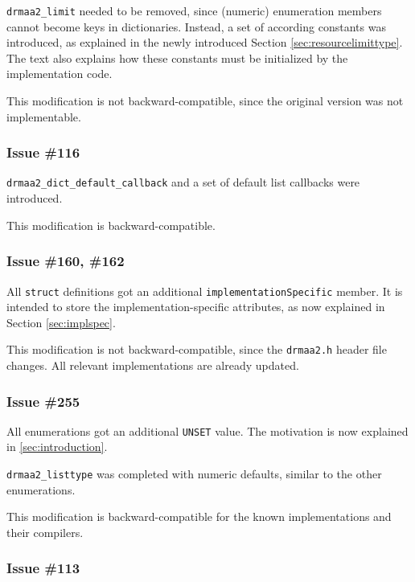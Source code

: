 \documentclass{article}
\newcommand{\h}[1]{\texttt{#1}}
\newcommand{\rat}[1]{}
\begin{document}
\lstinline{drmaa2_limit} needed to be removed, since (numeric) enumeration members cannot become keys in dictionaries. Instead, a set of according constants was introduced, as explained in the newly introduced Section \ref{sec:resourcelimittype}. The text also explains how these constants must be initialized by the implementation code.

\rat{The issue text further discusses why the extern const approach was favoured over a simple macro definition. The main reason is convinience for C++ people.}

This modification is not backward-compatible, since the original version was not implementable.

\subsubsection*{Issue \#116}

\h{drmaa2\_dict\_default\_callback} and a set of default list callbacks were introduced.

This modification is backward-compatible.

\subsubsection*{Issue \#160, \#162}

All \h{struct} definitions got an additional \h{implementationSpecific} member. It is intended to store the implementation-specific attributes, as now explained in Section \ref{sec:implspec}.

This modification is not backward-compatible, since the \h{drmaa2.h} header file changes. All relevant implementations are already updated.

\subsubsection*{Issue \#255}

All enumerations got an additional \h{UNSET} value. The motivation is now explained in \ref{sec:introduction}.

\h{drmaa2\_listtype} was completed with numeric defaults, similar to the other enumerations.

This modification is backward-compatible for the known implementations and their compilers.

\subsubsection*{Issue \#113}
\end{document}
